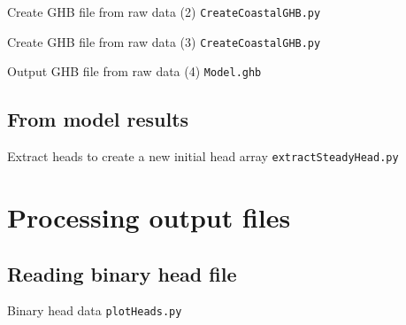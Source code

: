\documentclass[t]{beamer}
\begin{document}
\begin{frame}{Create GHB file from raw data (2)}
  \small{\texttt{CreateCoastalGHB.py}}
  \begin{figure}[ht]
  \centering
        \lstset{numbers=left}
        
   \end{figure}
\end{frame}

\begin{frame}{Create GHB file from raw data (3)}
  \small{\texttt{CreateCoastalGHB.py}}
  \begin{figure}[ht]
  \centering
        \lstset{numbers=left}
        
   \end{figure}
\end{frame}

\begin{frame}{Output GHB file from raw data (4)}
  \small{\texttt{Model.ghb}}
  \begin{figure}[ht]
  \centering
        \lstset{numbers=left}
        
        
   \end{figure}
\end{frame}

\subsection{From model results}
\begin{frame}{Extract heads to create a new initial head array}
\small{\texttt{extractSteadyHead.py}}
  \begin{figure}[ht]
  \centering
        \lstset{numbers=left}
        
   \end{figure}
\end{frame}

\section{Processing output files}
\subsection{Reading binary head file}
\begin{frame}{Binary head data}
\small{\texttt{plotHeads.py}}
  \begin{figure}[ht]
  \centering
        \lstset{numbers=left}
        
        
   \end{figure}
\end{frame}
\end{document}
